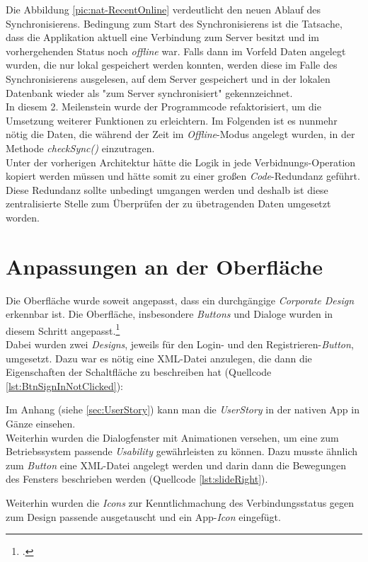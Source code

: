 Die Abbildung \ref{pic:nat-RecentOnline} verdeutlicht den neuen Ablauf des Synchronisierens. Bedingung zum Start des Synchronisierens ist die Tatsache, dass die Applikation aktuell eine Verbindung zum Server besitzt und im vorhergehenden Status noch \textit{offline} war. Falls dann im Vorfeld Daten angelegt wurden, die nur lokal gespeichert werden konnten, werden diese im Falle des Synchronisierens ausgelesen, auf dem Server gespeichert und in der lokalen Datenbank wieder als "zum Server synchronisiert" gekennzeichnet.\\
In diesem 2. Meilenstein wurde der Programmcode refaktorisiert, um die Umsetzung weiterer Funktionen zu erleichtern. Im Folgenden ist es nunmehr nötig die Daten, die während der Zeit im \textit{Offline}-Modus angelegt wurden, in der Methode \textit{checkSync()} einzutragen.\\
Unter der vorherigen Architektur hätte die Logik in jede Verbidnungs-Operation kopiert werden müssen und hätte somit zu einer großen \textit{Code}-Redundanz geführt. Diese Redundanz sollte unbedingt umgangen werden und deshalb ist diese zentralisierte Stelle zum Überprüfen der zu übetragenden Daten umgesetzt worden.

\section{Anpassungen an der Oberfläche}
\label{sec:anpassungen-oberflaeche}
Die Oberfläche wurde soweit angepasst, dass ein durchgängige \textit{Corporate Design} erkennbar ist. Die Oberfläche, insbesondere \textit{Buttons} und Dialoge wurden in diesem Schritt angepasst.\footcite{Android-Oberflaechen}\\
Dabei wurden zwei \textit{Designs}, jeweils für den Login- und den Registrieren-\textit{Button}, umgesetzt. Dazu war es nötig eine \ac{XML}-Datei anzulegen, die dann die Eigenschaften der Schaltfläche zu beschreiben hat (Quellcode \ref{lst:BtnSignInNotClicked}):

Im Anhang (siehe \ref{sec:UserStory}) kann man die \textit{UserStory} in der nativen App in Gänze einsehen.\\ 
Weiterhin wurden die Dialogfenster mit Animationen versehen, um eine zum Betriebssystem passende \textit{Usability} gewährleisten zu können. Dazu musste ähnlich zum \textit{Button} eine \ac{XML}-Datei angelegt werden und darin dann die Bewegungen des Fensters beschrieben werden (Quellcode \ref{lst:slideRight}).

Weiterhin wurden die \textit{Icons} zur Kenntlichmachung des Verbindungsstatus gegen zum Design passende ausgetauscht und ein App-\textit{Icon} eingefügt.

